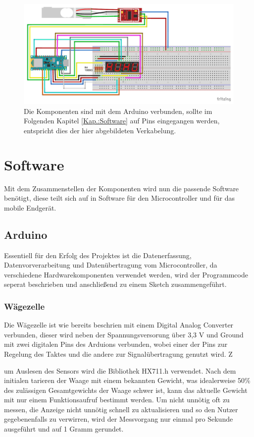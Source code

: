 \begin{figure}[hbtp]
	\centering
	\includegraphics[width=1\textwidth]{Bilder/Platinenlayout.pdf}
	\caption{Die Komponenten sind mit dem Arduino verbunden, sollte im Folgenden Kapitel \ref{Kap.:Software} auf Pins eingegangen werden, entspricht dies der hier abgebildeten Verkabelung.}
	\label{fig.:Frizzing}
\end{figure} 

\section{Software\label{Kap.:Software}}

Mit dem Zusammenstellen der Komponenten wird nun die passende Software benötigt, diese teilt sich auf in Software für den Microcontroller und für das mobile Endgerät.

\subsection{Arduino}
Essentiell für den Erfolg des Projektes ist die Datenerfassung, Datenvorverarbeitung und Datenübertragung vom Microcontroller, da verschiedene Hardwarekomponenten verwendet werden, wird der Programmcode seperat beschrieben und anschließend zu einem Sketch zusammengeführt. 

\subsubsection{Wägezelle}

Die Wägezelle ist wie bereits beschrien mit einem Digital Analog Converter verbunden, dieser wird neben der Spannungsversorung über 3,3 V und Ground mit zwei digitalen Pins des Arduions verbunden, wobei einer der Pins zur Regelung des Taktes und die andere zur Signalübertragung genutzt wird. Z

um Auslesen des Sensors wird die Bibliothek HX711.h verwendet. 
Nach dem initialen tarieren der Waage mit einem bekannten Gewicht, was idealerweise 50\% des zulässigen Gesamtgewichts der Waage schwer ist, kann das aktuelle Gewicht mit nur einem Funktionsaufruf bestimmt werden. Um nicht unnötig oft zu messen, die Anzeige nicht unnötig schnell zu aktualisieren und so den Nutzer gegebenenfalls zu verwirren, wird der Messvorgang nur einmal pro Sekunde ausgeführt und auf 1 Gramm gerundet.
